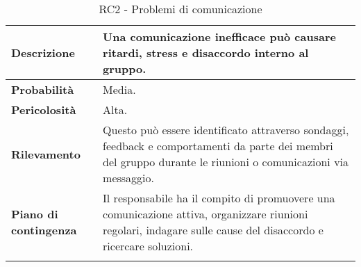 \begin{longtable}{ | l | p{10cm} | }
    \hline
    \textbf{Descrizione} & Una comunicazione inefficace può causare ritardi, stress e disaccordo interno al gruppo. \\
    \hline
    \textbf{Probabilità} & Media. \\
    \hline
    \textbf{Pericolosità} & Alta. \\
    \hline
    \textbf{Rilevamento} & Questo può essere identificato attraverso sondaggi, feedback e comportamenti da parte dei membri del gruppo durante le riunioni o comunicazioni via messaggio. \\
    \hline
    \textbf{Piano di contingenza} & Il responsabile ha il compito di promuovere una comunicazione attiva, organizzare riunioni regolari, indagare sulle cause del disaccordo e ricercare soluzioni. \\
    \hline
    \caption{RC2 - Problemi di comunicazione}
    \label{table:9}
\end{longtable}